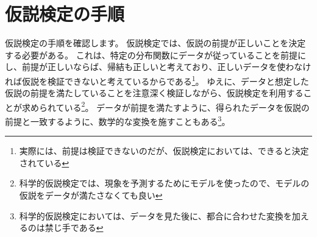 \section{仮説検定の手順}
仮説検定の手順を確認します。
仮説検定では、仮説の前提が正しいことを決定する必要がある。
これは、特定の分布関数にデータが従っていることを前提にし、前提が正しいならば、帰結も正しいと考えており、正しいデータを使わなければ仮説を検証できないと考えているからである\footnote{実際には、前提は検証できないのだが、仮説検定においては、できると決定されている}。%
ゆえに、データと想定した仮説の前提を満たしていることを注意深く検証しながら、仮説検定を利用することが求められている\footnote{科学的仮説検定では、現象を予測するためにモデルを使ったので、モデルの仮説をデータが満たさなくても良い}。
データが前提を満たすように、得られたデータを仮説の前提と一致するように、数学的な変換を施すこともある\footnote{科学的仮説検定においては、データを見た後に、都合に合わせた変換を加えるのは禁じ手である}。

